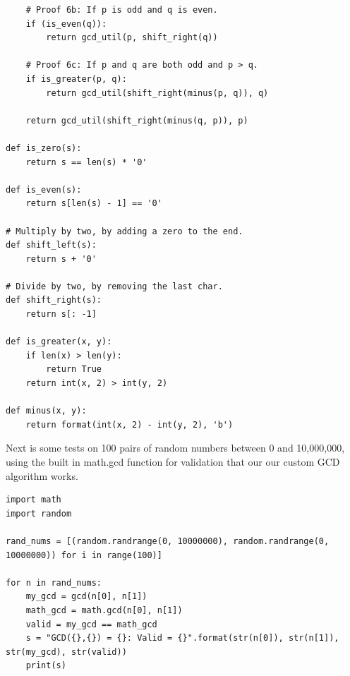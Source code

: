 \documentclass{article}
\begin{document}
\begin{enumerate}
\begin{enumerate}
\begin{lstlisting}
    # Proof 6b: If p is odd and q is even.
    if (is_even(q)):
        return gcd_util(p, shift_right(q))

    # Proof 6c: If p and q are both odd and p > q.
    if is_greater(p, q):
        return gcd_util(shift_right(minus(p, q)), q)

    return gcd_util(shift_right(minus(q, p)), p)

def is_zero(s):
    return s == len(s) * '0'

def is_even(s):
    return s[len(s) - 1] == '0'

# Multiply by two, by adding a zero to the end.
def shift_left(s):
    return s + '0'

# Divide by two, by removing the last char.
def shift_right(s):
    return s[: -1]

def is_greater(x, y):
    if len(x) > len(y):
        return True
    return int(x, 2) > int(y, 2)

def minus(x, y):
    return format(int(x, 2) - int(y, 2), 'b')          
        \end{lstlisting}

        Next is some tests on 100 pairs of random numbers between 0 and 10,000,000, using the built in math.gcd function for validation that our our custom GCD algorithm works.

        \begin{lstlisting}
import math
import random

rand_nums = [(random.randrange(0, 10000000), random.randrange(0, 10000000)) for i in range(100)]

for n in rand_nums:
    my_gcd = gcd(n[0], n[1])
    math_gcd = math.gcd(n[0], n[1])
    valid = my_gcd == math_gcd
    s = "GCD({},{}) = {}: Valid = {}".format(str(n[0]), str(n[1]), str(my_gcd), str(valid))
    print(s)


\end{lstlisting}
\end{enumerate}
\end{enumerate}
\end{document}
